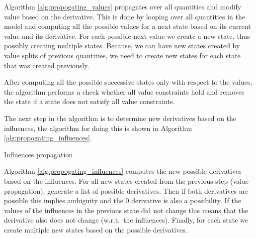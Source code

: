 \documentclass[a4paper]{article}
\begin{document}
Algorithm \ref{alg:propogating_values} propagates over all quantities and modify value based on the derivative. This is done by looping over all quantities in the model and computing all the possible values for a next state based on its current value and its derivative. For each possible next value we create a new state, thus possibly creating multiple states. Because, we can have new states created by value splits of previous quantities, we need to create new states for each state that was created previously.


After computing all the possible successive states only with respect to the values, the algorithm performs a check whether all value constraints hold and removes the state if a state does not satisfy all value constraints.

The next step in the algorithm is to determine new derivatives based on the influences, the algorithm for doing this is shown in Algorithm \ref{alg:propogating_influences}.

\vspace{12pt}
\begin{algorithm}[H]

\caption{Influences propagation}
\label{alg:propogating_influences}
\end{algorithm}
\vspace{12pt}

Algorithm \ref{alg:propogating_influences} computes the new possible derivatives based on the influences. For all new states created from the previous step (value propagation), generate a list of possible derivatives. Then if both derivatives are possible this implies ambiguity and the 0 derivative is also a possibility. If the values of the influences in the previous state did not change this means that the derivative also does not change (w.r.t.\ the influences). Finally, for each state we create multiple new states based on the possible derivatives.
\end{document}
